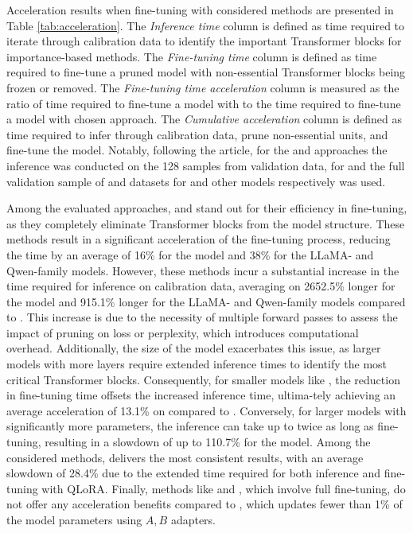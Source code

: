 Acceleration results when fine-tuning with considered methods are presented in Table \ref{tab:acceleration}. The \textit{Inference time} column is defined as time required to iterate through calibration data to identify the important Transformer blocks for importance-based methods. The \textit{Fine-tuning time} column is defined as time required to fine-tune a pruned model with non-essential Transformer blocks being frozen or removed. The \textit{Fine-tuning time acceleration} column is measured as the ratio of time required to fine-tune a model with \lora{} to the time required to fine-tune a model with chosen approach. The \textit{Cumulative acceleration} column is defined as time required to infer through calibration data, prune non-essential units, and fine-tune the model. Notably, following the article, for the \shortllama{} and \sleb{} approaches the inference was conducted on the 128 samples from validation data, for \uidl{} and \ows{} the full validation sample of \eTwoENLG{} and \alpaca{} datasets for \gpt{} and other models respectively was used. 

Among the evaluated approaches, \sleb{} and \shortllama{} stand out for their efficiency in fine-tuning, as they completely eliminate Transformer blocks from the model structure. These methods result in a significant acceleration of the fine-tuning process, reducing the time by an average of 16\% for the \gpt{} model and 38\% for the LLaMA- and Qwen-family models. However, these methods incur a substantial increase in the time required for inference on calibration data, averaging on 2652.5\% longer for the \gpt{} model and 915.1\% longer for the LLaMA- and Qwen-family models compared to \uidl{}. This increase is due to the necessity of multiple forward passes to assess the impact of pruning on loss or perplexity, which introduces computational overhead. Additionally, the size of the model exacerbates this issue, as larger models with more layers require extended inference times to identify the most critical Transformer blocks. Consequently, for smaller models like \gpt{}, the reduction in fine-tuning time offsets the increased inference time, ultima-tely achieving an average acceleration of 13.1\% on \gpt{} compared to \lora{}. Conversely, for larger models with significantly more parameters, the inference can take up to twice as long as fine-tuning, resulting in a slowdown of up to 110.7\% for the \llamaTwoBig{} model. Among the considered methods, \uidl{} delivers the most consistent results, with an average slowdown of 28.4\% due to the extended time required for both inference and fine-tuning with QLoRA. Finally, methods like \lisa{} and \ows{}, which involve full fine-tuning, do not offer any acceleration benefits compared to \lora{}, which updates fewer than 1\% of the model parameters using $A,B$ adapters.

